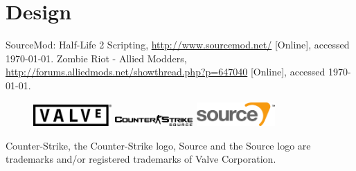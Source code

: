 \documentclass[a4paper, 11pt]{article}
\begin{document}
\section{Design}
\begin{thebibliography}{9}
SourceMod: Half-Life 2 Scripting, \url{http://www.sourcemod.net/} [Online], accessed \today.
Zombie Riot - Allied Modders, \url{http://forums.alliedmods.net/showthread.php?p=647040} [Online], accessed \today.
\end{thebibliography}
\vfill
\begin{figure}[h!]
\includegraphics[width=3cm]{Valve_logo.pdf}
\hfill
\includegraphics[width=3cm]{Counter-Strike_Source_logo.pdf}
\hfill
\includegraphics[width=3cm]{Source_engine_logo.pdf}
\end{figure}
Counter-Strike, the Counter-Strike logo, Source and the Source logo are trademarks and/or registered trademarks of Valve Corporation.
\end{document}

